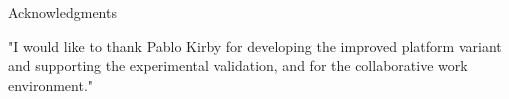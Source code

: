 \thispagestyle{empty}

\vspace*{20mm}

\begin{center}
    { Acknowledgments}
\end{center}

\vspace{10mm}

"I would like to thank Pablo Kirby for developing the improved platform variant 
and supporting the experimental validation, and for the collaborative work 
environment."

\cleardoublepage{}
